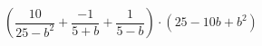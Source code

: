\begin{ex}[type=expression]
	\begin{condition}
		\(\left( \dfrac{10}{25-b^2}+\dfrac{-1}{5+b}+\dfrac{1}{5-b} \right)\cdot(25-10b+b^2)\)
	\end{condition}
\end{ex}